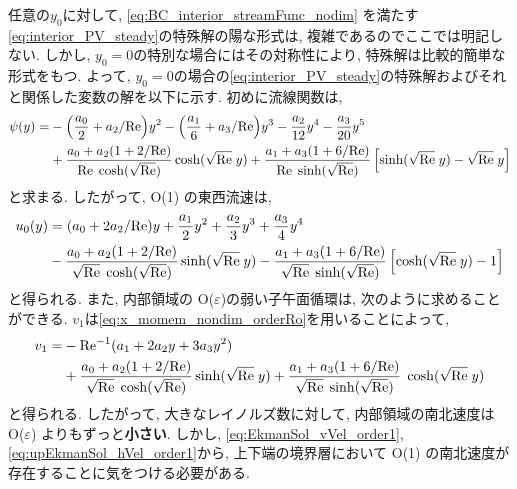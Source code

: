 任意の$y_0$に対して, \eqref{eq:BC_interior_streamFunc_nodim} を満たす\eqref{eq:interior_PV_steady}の特殊解の陽な形式は, 
複雑であるのでここでは明記しない. 
しかし, $y_0=0$の特別な場合にはその対称性により, 特殊解は比較的簡単な形式をもつ. 
よって, $y_0=0$の場合の\eqref{eq:interior_PV_steady}の特殊解およびそれと関係した変数の解を以下に示す. 
初めに流線関数は, 
\begin{equation}
\begin{split}
 \psi (y) = &- \Big(\dfrac{a_0}{2} + a_2/{\rm Re} \Big) y^2 - \Big(\dfrac{a_1}{6} + a_3/{\rm Re}\Big)y^3 - \dfrac{a_2}{12}y^4 - \dfrac{a_3}{20}y^5 \\
    &+  \dfrac{a_0 + a_2(1 + 2/{\rm Re})}{{\rm Re} \; \cosh (\sqrt{\rm Re})} \cosh (\sqrt{\rm Re} \; y)
    + \dfrac{a_1 + a_3(1 + 6/{\rm Re})}{{\rm Re} \; \sinh (\sqrt{\rm Re})} \left[ \sinh (\sqrt{\rm Re}\; y) - \sqrt{\rm Re} \; y \right]
\end{split}
\end{equation}
と求まる.  
したがって, O(1) の東西流速は, 
\begin{equation}
\begin{split}
 u_0 (y) &= (a_0 + 2a_2/{\rm Re}) y + \dfrac{a_1}{2}y^2 + \dfrac{a_2}{3}y^3 + \dfrac{a_3}{4}y^4 \\
    &-  \dfrac{a_0 + a_2(1 + 2/{\rm Re})}{\sqrt{\rm Re} \; \cosh (\sqrt{\rm Re})} \sinh (\sqrt{\rm Re} \; y)
    - \dfrac{a_1 + a_3(1 + 6/{\rm Re})}{\sqrt{\rm Re} \; \sinh (\sqrt{\rm Re})} \left[ \cosh (\sqrt{\rm Re}\; y) - 1 \right]
\end{split}
\label{eq:interior_zonalVel_order1}
\end{equation}
と得られる. 
また, 内部領域の O($\varepsilon$)の弱い子午面循環は, 次のように求めることができる. 
$v_1$は\eqref{eq:x_momem_nondim_orderRo}を用いることによって, 
\begin{equation}
\begin{split}
    v_1 =& - {\rm Re}^{-1} (a_1 + 2a_2 y + 3a_3 y^2) \\
    &+  \dfrac{a_0 + a_2(1 + 2/{\rm Re})}{\sqrt{\rm Re} \; \cosh (\sqrt{\rm Re})} \sinh (\sqrt{\rm Re} \; y)
    + \dfrac{a_1 + a_3(1 + 6/{\rm Re})}{\sqrt{\rm Re} \; \sinh (\sqrt{\rm Re})} \; \cosh (\sqrt{\rm Re}\; y)
\end{split}
\end{equation}
と得られる. 
したがって, 大きなレイノルズ数に対して, 内部領域の南北速度は O($\varepsilon$) よりもずっと\textbf{小さい}. 
しかし,  \eqref{eq:EkmanSol_vVel_order1}, \eqref{eq:upEkmanSol_hVel_order1}から, 
上下端の境界層において O(1) の南北速度が存在することに気をつける必要がある.   
